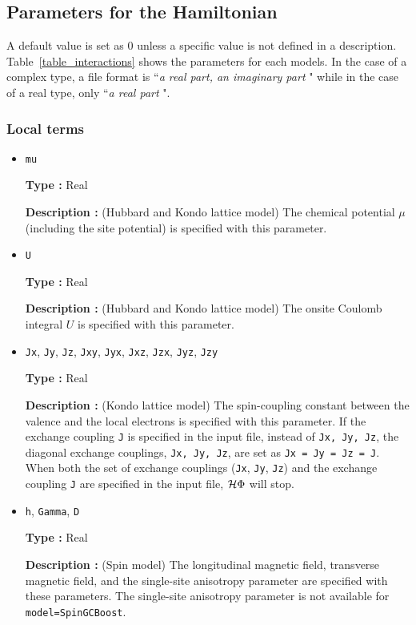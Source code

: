 \subsection{Parameters for the Hamiltonian}
A default value is set as $0$ unless a specific value is not defined in a description. 
Table~\ref{table_interactions} shows the parameters for each models. 
In the case of a complex type, a file format is ``{\it a real part, an imaginary part} "
 while in the case of a real type, only ``{\it a real part} ".


\subsubsection{Local terms}

\begin{itemize}

\item \verb|mu|

{\bf Type :} Real

{\bf Description :} (Hubbard and Kondo lattice model) 
The chemical potential $\mu$ (including the site potential)
is specified with this parameter.

\item \verb|U|

{\bf Type :} Real

{\bf Description :} (Hubbard and Kondo lattice model) 
The onsite Coulomb integral $U$ is specified with this parameter.

\item \verb|Jx|, \verb|Jy|, \verb|Jz|, \verb|Jxy|, 
  \verb|Jyx|, \verb|Jxz|, \verb|Jzx|, \verb|Jyz|, \verb|Jzy|

{\bf Type :} Real

{\bf Description :} (Kondo lattice model) 
The spin-coupling constant between the valence and the local electrons
is specified with this parameter.
If the exchange coupling \verb|J| is specified in the input file,
instead of \verb|Jx, Jy, Jz|,
the diagonal exchange couplings, \verb|Jx, Jy, Jz|, are set as \verb|Jx = Jy = Jz = J|.
When both
the set of exchange couplings (\verb|Jx|, \verb|Jy|, \verb|Jz|)
and the exchange coupling \verb|J| are specified in the input file,
$\mathcal{H} \Phi$ will stop.

\item \verb|h|, \verb|Gamma|, \verb|D|

{\bf Type :} Real

{\bf Description :} (Spin model)
The longitudinal magnetic field, transverse magnetic field, 
and the single-site anisotropy parameter are specified with these parameters.
The single-site anisotropy parameter is not available for \verb|model=SpinGCBoost|.

\end{itemize}

